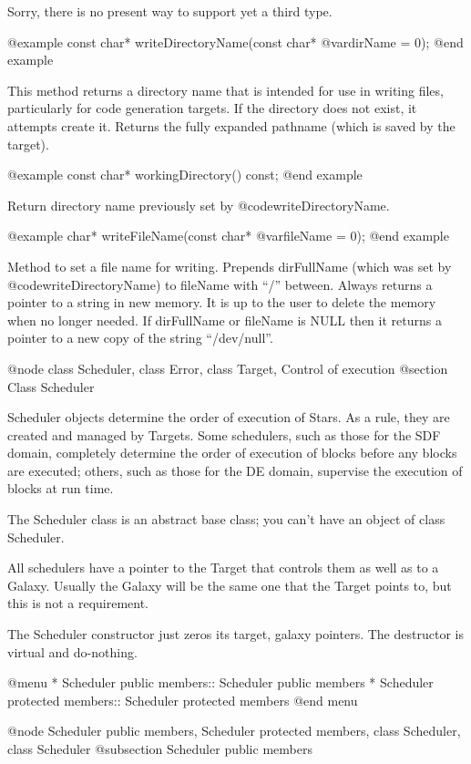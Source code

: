 Sorry, there is no present way to support yet a third type.

@example
const char* writeDirectoryName(const char* @var{dirName} = 0);
@end example

This method returns a directory name that is intended for
use in writing files, particularly for code generation targets.
If the directory does not exist, it attempts create it.
Returns the fully expanded pathname (which is saved by
the target).

@example
const char* workingDirectory() const;
@end example

Return directory name previously set by @code{writeDirectoryName}.

@example
char* writeFileName(const char* @var{fileName} = 0);
@end example

Method to set a file name for writing.  Prepends dirFullName (which was
set by @code{writeDirectoryName}) to fileName with ``/'' between.  Always returns
a pointer to a string in new memory.  It is up to the user to delete the
memory when no longer needed.  If dirFullName or fileName is NULL then
it returns a pointer to a new copy of the string ``/dev/null''.

@node class Scheduler, class Error, class Target, Control of execution
@section Class Scheduler

Scheduler objects determine the order of execution of Stars.  As a rule,
they are created and managed by Targets.  Some schedulers, such as those
for the SDF domain, completely determine the order of execution of
blocks before any blocks are executed; others, such as those for the
DE domain, supervise the execution of blocks at run time.

The Scheduler class is an abstract base class; you can't have an object
of class Scheduler.

All schedulers have a pointer to the Target that controls them as well
as to a Galaxy.  Usually the Galaxy will be the same one that the
Target points to, but this is not a requirement.

The Scheduler constructor just zeros its target, galaxy pointers.  The
destructor is virtual and do-nothing.

@menu
* Scheduler public members::    Scheduler public members
* Scheduler protected members::  Scheduler protected members
@end menu

@node Scheduler public members, Scheduler protected members, class Scheduler, class Scheduler
@subsection Scheduler public members

